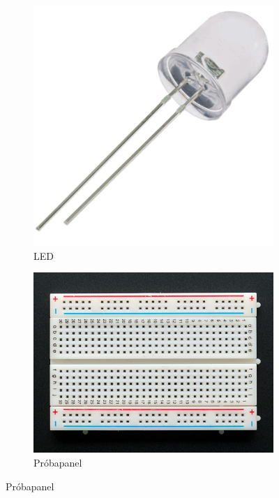 \documentclass[a4paper,12pt]{report}
\begin{document}
\begin{figure}[h!]
    \centering
    \begin{subfigure}[b]{0.4\linewidth}
        \includegraphics[width=\linewidth]{images/led.png}
        \caption{LED}
    \end{subfigure}
    \begin{subfigure}[b]{0.4\linewidth}
        \includegraphics[width=\linewidth]{images/probapanel.jpg}
        \caption{Próbapanel}

\end{subfigure}
\end{figure}
\end{document}
